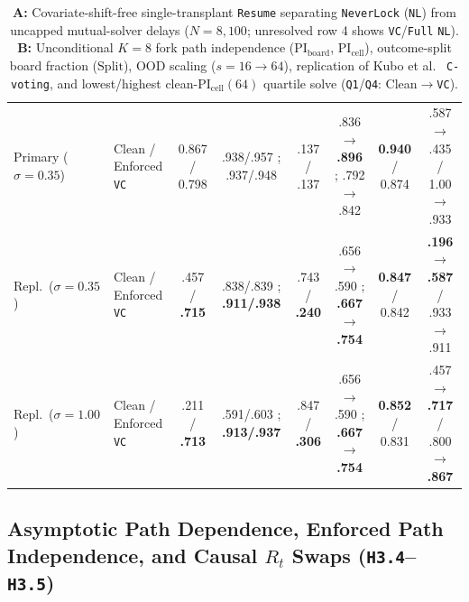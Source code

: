 \documentclass[10pt,letterpaper]{article}
\begin{document}
\begin{table}[t]
{\begin{tabular}{@{}llcccccc@{}}
\midrule
Primary ($\sigma{=}0.35$) & Clean / Enforced \texttt{VC} & 0.867 / 0.798 & .938/.957 ; .937/.948 & .137 / .137 & .836$\to$\textbf{.896} ; .792$\to$.842 & \textbf{0.940} / 0.874 & .587$\to$.435 / 1.00$\to$.933 \\
Repl.\ ($\sigma{=}0.35$) & Clean / Enforced \texttt{VC} & .457 / \textbf{.715} & .838/.839 ; \textbf{.911/.938} & .743 / \textbf{.240} & .656$\to$.590 ; \textbf{.667$\to$.754} & \textbf{0.847} / 0.842 & \textbf{.196$\to$.587} / .933$\to$.911 \\
Repl.\ ($\sigma{=}1.00$) & Clean / Enforced \texttt{VC} & .211 / \textbf{.713} & .591/.603 ; \textbf{.913/.937} & .847 / \textbf{.306} & .656$\to$.590 ; \textbf{.667$\to$.754} & \textbf{0.852} / 0.831 & .457$\to$\textbf{.717} / .800$\to$\textbf{.867} \\
\bottomrule
\end{tabular}%
}
\caption{\textbf{A:} Covariate-shift-free single-transplant \texttt{Resume} separating \texttt{NeverLock} (\texttt{NL}) from uncapped mutual-solver delays ($N=8{,}100$; unresolved row 4 shows \texttt{VC}/\texttt{Full} \texttt{NL}). \textbf{B:} Unconditional $K=8$ fork path independence ($\mathrm{PI}_{\mathrm{board}}$, $\mathrm{PI}_{\mathrm{cell}}$), outcome-split board fraction ($\mathrm{Split}$), OOD scaling ($s=16\to 64$), replication of Kubo et al.\ \cite{kubo2026cvoting} \texttt{C-voting}, and lowest/highest clean-$\mathrm{PI}_{\mathrm{cell}}(64)$ quartile solve (\texttt{Q1}/\texttt{Q4}: Clean$\to$\texttt{VC}).}
\label{tab:resume_pi}
\end{table}

\subsection{Asymptotic Path Dependence, Enforced Path Independence, and Causal \texorpdfstring{$R_t$}{R\_t} Swaps (\texttt{H3.4}--\texttt{H3.5})}
\end{document}
